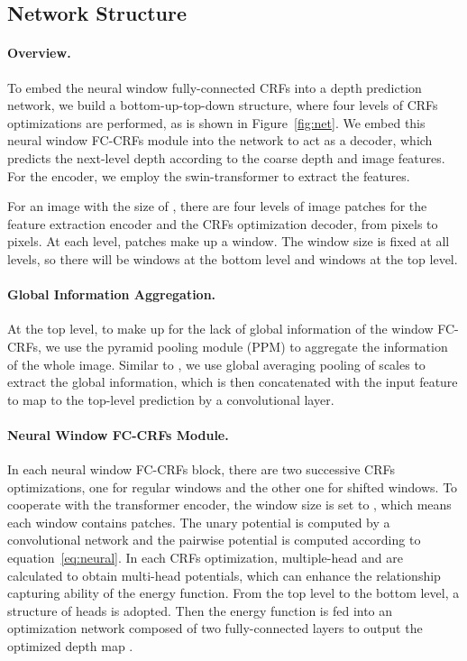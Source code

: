\documentclass[10pt,twocolumn,letterpaper]{article}
\begin{document}
\subsection{Network Structure}

\paragraph{Overview.} 
To embed the neural window fully-connected CRFs into a depth prediction network, we build a bottom-up-top-down structure, where four levels of CRFs optimizations are performed, as is shown in Figure~\ref{fig:net}. We embed this neural window FC-CRFs module into the network to act as a decoder, which predicts the next-level depth according to the coarse depth and image features.
For the encoder, we employ the swin-transformer\cite{liu2021swin} to extract the features.

For an image with the size of , there are four levels of image patches for the feature extraction encoder and the CRFs optimization decoder, from  pixels to  pixels.
At each level,  patches make up a window. The window size  is fixed at all levels, so there will be  windows at the bottom level and  windows at the top level. 

\vspace{-3mm}
\paragraph{Global Information Aggregation.}
At the top level, to make up for the lack of global information of the window FC-CRFs, we use the pyramid pooling module (PPM) \cite{zhao2017pyramid} to aggregate the information of the whole image. Similar to \cite{zhao2017pyramid}, we use global averaging pooling of scales  to extract the global information, which is then concatenated with the input feature to map to the top-level prediction  by a convolutional layer.

\vspace{-3mm}
\paragraph{Neural Window FC-CRFs Module.}
In each neural window FC-CRFs block, there are two successive CRFs optimizations, one for regular windows and the other one for shifted windows. 
To cooperate with the transformer encoder, the window size  is set to , which means each window contains  patches.
The unary potential is computed by a convolutional network and the pairwise potential is computed according to equation~\ref{eq:neural}.
In each CRFs optimization, multiple-head  and  are calculated to obtain multi-head potentials, which can enhance the relationship capturing ability of the energy function. 
From the top level to the bottom level, a structure of  heads is adopted.
Then the energy function is fed into an optimization network composed of two fully-connected layers to output the optimized depth map . 
\end{document}
